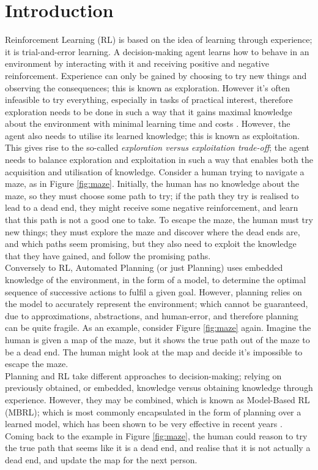 
\chapter{Introduction}
\label{chapter1}
Reinforcement Learning (RL) \cite{Sutton1998} is based on the idea of learning through experience; it is trial-and-error learning. A decision-making agent learns how to behave in an environment by interacting with it and receiving positive and negative reinforcement. Experience can only be gained by choosing to try new things and observing the consequences; this is known as exploration. However it's often infeasible to try everything, especially in tasks of practical interest, therefore exploration needs to be done in such a way that it gains maximal knowledge about the environment with minimal learning time and costs \cite{Thrun-1992-15850}. However, the agent also needs to utilise its learned knowledge; this is known as exploitation. This gives rise to the so-called \textit{exploration versus exploitation trade-off}; the agent needs to balance exploration and exploitation in such a way that enables both the acquisition and utilisation of knowledge. Consider a human trying to navigate a maze, as in Figure \ref{fig:maze}. Initially, the human has no knowledge about the maze, so they must choose some path to try; if the path they try is realised to lead to a dead end, they might receive some negative reinforcement, and learn that this path is not a good one to take. To escape the maze, the human must try new things; they must explore the maze and discover where the dead ends are, and which paths seem promising, but they also need to exploit the knowledge that they have gained, and follow the promising paths. 
\\Conversely to RL, Automated Planning (or just Planning) \cite{GhallabNauTraverso04, Lav06, DBLP:books/aw/RN2020} uses embedded knowledge of the environment, in the form of a model, to determine the optimal sequence of successive actions to fulfil a given goal. However, planning relies on the model to accurately represent the environment; which cannot be guaranteed, due to approximations, abstractions, and human-error, and therefore planning can be quite fragile. As an example, consider Figure \ref{fig:maze} again. Imagine the human is given a map of the maze, but it shows the true path out of the maze to be a dead end. The human might look at the map and decide it's impossible to escape the maze.
\\Planning and RL take different approaches to decision-making; relying on previously obtained, or embedded, knowledge versus obtaining knowledge through experience. However, they may be combined, which is known as Model-Based RL (MBRL); which is most commonly encapsulated in the form of planning over a learned model, which has been shown to be very effective in recent years \cite{silver2017mastering, pmlr-v28-levine13}. Coming back to the example in Figure \ref{fig:maze}, the human could reason to try the true path that seems like it is a dead end, and realise that it is not actually a dead end, and update the map for the next person.
